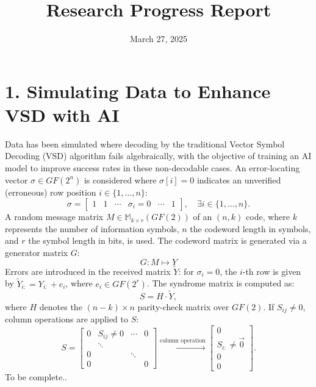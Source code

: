 \documentclass[a4paper,12pt]{article}
\title{Research Progress Report}
\author{}
\date{March 27, 2025}
\begin{document}
\maketitle

\section*{1. Simulating Data to Enhance VSD with AI}
Data has been simulated where decoding by the traditional Vector Symbol Decoding (VSD) algorithm fails algebraically, with the objective of training an AI model to improve success rates in these non-decodable cases. An error-locating vector \(\sigma \in GF(2^n)\) is considered where \(\sigma[i] = 0\) indicates an unverified (erroneous) row position \(i \in \{1, \dots, n\}\):
\[
\sigma = \begin{bmatrix} 1 & 1 & \cdots & \sigma_i = 0 & \cdots & 1 \end{bmatrix}, \quad \exists i \in \{1, \dots, n\}.
\]
A random message matrix \(M \in \mathbb{M}_{k \times r}(GF(2))\) of an \((n, k)\) code, where \(k\) represents the number of information symbols, \(n\) the codeword length in symbols, and \(r\) the symbol length in bits, is used. The codeword matrix is generated via a generator matrix \(G\):
\[
G:M \mapsto Y 
\]
Errors are introduced in the received matrix \(\tilde{Y}\): for \(\sigma_i = 0\), the \(i\)-th row is given by \(\tilde{Y}_{i:} = Y_{i:} + e_i\), where \(e_i \in GF(2^r)\). The syndrome matrix is computed as:
\[
S = H \cdot \tilde{Y},
\]
where \(H\) denotes the \((n - k) \times n\) parity-check matrix over \(GF(2)\). If \(S_{ij} \neq 0\), column operations are applied to \(S\):
\[
S = \begin{bmatrix}
0 & S_{ij} \neq 0 & \cdots & 0 \\
 & \ddots & & \\
0 & & \ddots & \\
0 & & & 0
\end{bmatrix} \xrightarrow{\text{column operation}} \begin{bmatrix}
0 \\
S_{i:} \neq \vec{0} \\
0 \\
0
\end{bmatrix}.
\]
To be complete..
\end{document}
